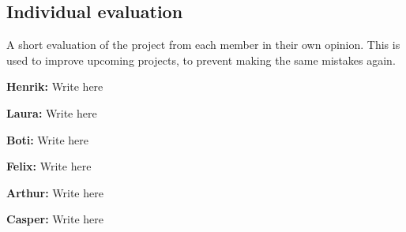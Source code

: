 \documentclass[../report.tex]{subfiles}
\begin{document}
\subsection{Individual evaluation}
A short evaluation of the project from each member in their own opinion. This is used to improve
upcoming projects, to prevent making the same mistakes again.

\textbf{Henrik:}
Write here

\textbf{Laura:}
Write here

\textbf{Boti:}
Write here

\textbf{Felix:}
Write here

\textbf{Arthur:}
Write here

\textbf{Casper:}
Write here
\end{document}
